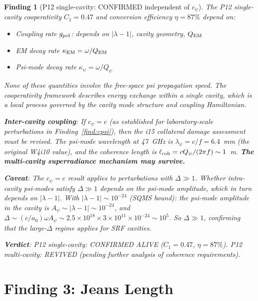 \documentclass[11pt]{article}
\newtheorem{finding}{Finding}
\newcommand{\ee}[1]{\times 10^{#1}}
\begin{document}
\begin{finding}[P12 single-cavity: CONFIRMED independent of $c_\psi$]
\label{find:p12}
The P12 single-cavity cooperativity $C_1 = 0.47$ and conversion efficiency
$\eta = 87\%$ depend on:
\begin{itemize}[nosep]
\item Coupling rate $g_{\rm pol}$: depends on $|\lambda - 1|$, cavity geometry, $Q_{\rm EM}$
\item EM decay rate $\kappa_{\rm EM} = \omega/Q_{\rm EM}$
\item Psi-mode decay rate $\kappa_\psi = \omega/Q_\psi$
\end{itemize}
None of these quantities involve the free-space psi propagation speed.
The cooperativity framework describes energy exchange \emph{within}
a single cavity, which is a local process governed by the cavity mode
structure and coupling Hamiltonian.

\textbf{Inter-cavity coupling}: If $c_\psi = c$ (as established for
laboratory-scale perturbations in Finding~\ref{find:cpsi}), then the
i15 collateral damage assessment must be revised. The psi-mode wavelength
at 47~GHz is $\lambda_\psi = c/f = 6.4$~mm (the original W4i10 value),
and the coherence length is $\ell_{\rm coh} = c Q_\psi/(2\pi f) \sim 1$~m.
\textbf{The multi-cavity superradiance mechanism may survive.}

\textbf{Caveat}: The $c_\psi = c$ result applies to perturbations with
$\Delta \gg 1$. Whether intra-cavity psi-modes satisfy $\Delta \gg 1$
depends on the psi-mode amplitude, which in turn depends on $|\lambda - 1|$.
With $|\lambda - 1| \sim 10^{-24}$ (SQMS bound): the psi-mode amplitude
in the cavity is $A_\psi \sim |\lambda - 1| \sim 10^{-24}$, and
$\Delta \sim (c/a_0)\omega A_\psi \sim 2.5\ee{18} \times 3\ee{11} \times
10^{-24} \sim 10^{5}$. So $\Delta \gg 1$, confirming that the large-$\Delta$
regime applies for SRF cavities.

\textbf{Verdict}: P12 single-cavity: CONFIRMED ALIVE ($C_1 = 0.47$,
$\eta = 87\%$). P12 multi-cavity: REVIVED (pending further analysis
of coherence requirements).
\end{finding}


\part{Finding 3: Jeans Length}
\label{part:jeans}
\end{document}
